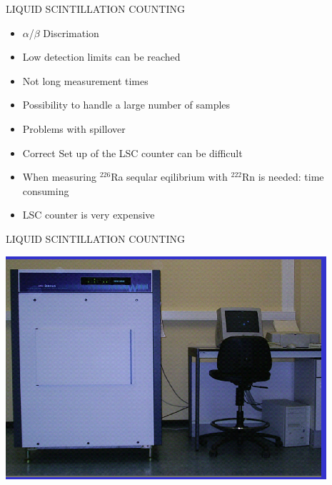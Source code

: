 \begin{frame}{LIQUID SCINTILLATION COUNTING }

\begin{exampleblock}{}

\begin{itemize}
	\item $\alpha$/$\beta$ Discrimation
 \item Low detection limits can be reached
 \item Not long measurement times
 \item Possibility to handle a large number of samples  
\end{itemize}

\end{exampleblock}

\begin{alertblock}{}

\begin{itemize}
	\item Problems with spillover
 \item Correct Set up of the LSC counter can be difficult
 \item When measuring $^{226}$Ra seqular eqilibrium with $^{222}$Rn is needed: time consuming
 \item LSC counter is very expensive
\end{itemize}

\end{alertblock}

\end{frame}

\begin{frame}{LIQUID SCINTILLATION COUNTING }

\centering
\includegraphics[scale=0.5]{figures/quantulus.png}

\end{frame}

